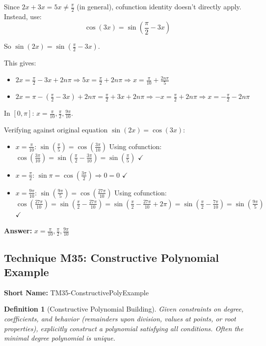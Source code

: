 \documentclass[12pt]{article}
\newtheorem{definition}{Definition}[section]
\newenvironment{solution}
{\begin{tcolorbox}[colback=green!5!white,colframe=green!75!black,title={Solution}]}{\end{tcolorbox}}
\begin{document}
\begin{solution}
Since $2x + 3x = 5x \neq \frac{\pi}{2}$ (in general), cofunction identity doesn't directly apply. Instead, use:
\[\cos(3x) = \sin\left(\frac{\pi}{2} - 3x\right)\]

So $\sin(2x) = \sin\left(\frac{\pi}{2} - 3x\right)$.

This gives:
\begin{itemize}
    \item $2x = \frac{\pi}{2} - 3x + 2n\pi \Rightarrow 5x = \frac{\pi}{2} + 2n\pi \Rightarrow x = \frac{\pi}{10} + \frac{2n\pi}{5}$
    \item $2x = \pi - \left(\frac{\pi}{2} - 3x\right) + 2n\pi = \frac{\pi}{2} + 3x + 2n\pi \Rightarrow -x = \frac{\pi}{2} + 2n\pi \Rightarrow x = -\frac{\pi}{2} - 2n\pi$
\end{itemize}

In $[0, \pi]$: $x = \frac{\pi}{10}, \frac{\pi}{2}, \frac{9\pi}{10}$.

Verifying against original equation $\sin(2x) = \cos(3x)$:
\begin{itemize}
    \item $x = \frac{\pi}{10}$: $\sin\left(\frac{\pi}{5}\right) = \cos\left(\frac{3\pi}{10}\right)$
    Using cofunction: $\cos\left(\frac{3\pi}{10}\right) = \sin\left(\frac{\pi}{2} - \frac{3\pi}{10}\right) = \sin\left(\frac{\pi}{5}\right)$ $\checkmark$
    \item $x = \frac{\pi}{2}$: $\sin\pi = \cos\left(\frac{3\pi}{2}\right) \Rightarrow 0 = 0$ $\checkmark$
    \item $x = \frac{9\pi}{10}$: $\sin\left(\frac{9\pi}{5}\right) = \cos\left(\frac{27\pi}{10}\right)$
    Using cofunction: $\cos\left(\frac{27\pi}{10}\right) = \sin\left(\frac{\pi}{2} - \frac{27\pi}{10}\right) = \sin\left(\frac{\pi}{2} - \frac{27\pi}{10} + 2\pi\right) = \sin\left(\frac{\pi}{2} - \frac{7\pi}{10}\right) = \sin\left(\frac{9\pi}{5}\right)$ $\checkmark$
\end{itemize}

\textbf{Answer:} $x = \frac{\pi}{10}, \frac{\pi}{2}, \frac{9\pi}{10}$
\end{solution}

\subsection{Technique M35: Constructive Polynomial Example}
\textbf{Short Name:} TM35-ConstructivePolyExample

\begin{definition}[Constructive Polynomial Building]
Given constraints on degree, coefficients, and behavior (remainders upon division, values at points, or root properties), explicitly construct a polynomial satisfying all conditions. Often the minimal degree polynomial is unique.
\end{definition}
\end{document}
